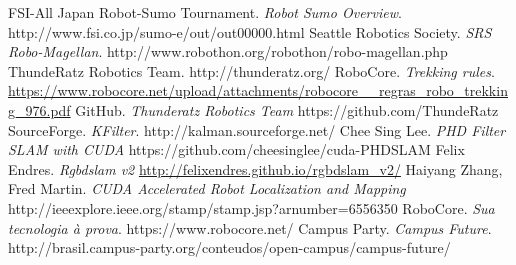 \documentclass[conference]{IEEEtran}
\begin{document}
\begin{thebibliography}{30}
    FSI-All Japan Robot-Sumo Tournament. \emph{Robot Sumo Overview}. http://www.fsi.co.jp/sumo-e/out/out00000.html
    Seattle Robotics Society. \emph{SRS Robo-Magellan}. http://www.robothon.org/robothon/robo-magellan.php
    ThundeRatz Robotics Team. http://thunderatz.org/
    RoboCore. \emph{Trekking rules}. \url{https://www.robocore.net/upload/attachments/robocore__regras_robo_trekking_976.pdf}
    GitHub. \emph{Thunderatz Robotics Team} https://github.com/ThundeRatz
    SourceForge. \emph{KFilter}. http://kalman.sourceforge.net/
    Chee Sing Lee. \emph{PHD Filter SLAM with CUDA} https://github.com/cheesinglee/cuda-PHDSLAM
    Felix Endres. \emph{Rgbdslam v2} \url{http://felixendres.github.io/rgbdslam_v2/}
    Haiyang Zhang, Fred Martin. \emph{CUDA Accelerated Robot Localization and Mapping}
    http://ieeexplore.ieee.org/stamp/stamp.jsp?arnumber=6556350
    RoboCore. \emph{Sua tecnologia à prova}. https://www.robocore.net/
    Campus Party. \emph{Campus Future}. http://brasil.campus-party.org/conteudos/open-campus/campus-future/
\end{thebibliography}
\end{document}
